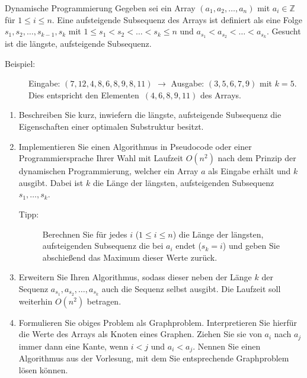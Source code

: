 \documentclass[11pt,a4paper]{article}
\begin{document}
\begin{aufgabe}{3}{\hard Dynamische Programmierung}
    Gegeben sei ein Array $(a_1, a_2, \ldots, a_n)$ mit $a_i \in \mathbb{Z}$ für $1 \leq i \leq n$.
    Eine aufsteigende Subsequenz des Arrays ist definiert als eine Folge $s_1, s_2, \ldots, s_{k - 1}, s_k$ mit $1 \leq s_1 < s_2 < \ldots < s_k \leq n$ und $a_{s_1} < a_{s_2} < \ldots < a_{s_k}$.
    Gesucht ist die längste, aufsteigende Subsequenz.
    \begin{description}
        \item[Beispiel:] Eingabe: $(7, 12, 4, 8, 6, 8, 9, 8, 11)$ $\rightarrow$ Ausgabe: $(3, 5, 6, 7, 9)$ mit $k = 5$. Dies entspricht den Elementen~$(4, 6, 8, 9, 11)$ des Arrays.
    \end{description}
    \begin{enumerate}[label=\alph*)]
        \item\label{optimal_substructure} Beschreiben Sie kurz, inwiefern die längste, aufsteigende Subsequenz die Eigenschaften einer optimalen Substruktur besitzt.
        \item\label{dynamic} Implementieren Sie einen Algorithmus in Pseudocode oder einer Programmiersprache Ihrer Wahl mit Laufzeit $O(n^2)$ nach dem Prinzip der dynamischen Programmierung, welcher ein Array $a$ als Eingabe erhält und $k$ ausgibt.
        Dabei ist $k$ die Länge der längsten, aufsteigenden Subsequenz $s_1, \ldots, s_k$.
        \begin{description}
            \item[Tipp:] Berechnen Sie für jedes $i$ ($1 \leq i \leq n$) die Länge der längsten, aufsteigenden Subsequenz die bei $a_i$ endet ($s_k = i$) und geben Sie abschießend das Maximum dieser Werte zurück.
        \end{description}
        \item Erweitern Sie Ihren Algorithmus, sodass dieser neben der Länge $k$ der Sequenz $a_{s_1}, a_{s_2}, \ldots, a_{s_k}$ auch die Sequenz selbst ausgibt.
        Die Laufzeit soll weiterhin $O(n^2)$ betragen.
        \item
        Formulieren Sie obiges Problem als Graphproblem.
        Interpretieren Sie hierfür die Werte des Arrays als Knoten eines Graphen.
        Ziehen Sie sie von $a_i$ nach $a_j$ immer dann eine Kante, wenn $i < j$ und $a_i < a_j$.
        Nennen Sie einen Algorithmus aus der Vorlesung, mit dem Sie entsprechende Graphproblem lösen können.
    \end{enumerate}
\end{aufgabe}
\end{document}

